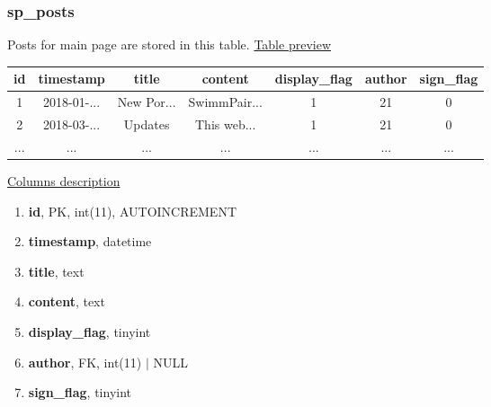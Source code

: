 \subsubsection*{sp\_posts}
Posts for main page are stored in this table.
\newline
\underline{Table preview}
\begin{center}
  \begin{tabular}{||c c c c c c c||} 
  \hline
  id & timestamp & title & content & display\_flag & author & sign\_flag  \\ [0.5ex] 
  \hline\hline
  1 & 2018-01-... & New Por... & SwimmPair... & 1 & 21 & 0 \\ 
  \hline
  2 & 2018-03-...  & Updates & This web... & 1 & 21 & 0 \\ 
 \hline
  ... & ... & ... & ... & ... & ...  & ... \\ [0.5ex] 
  \hline
  \end{tabular}
\end{center}
\underline{Columns description}
\begin{enumerate}
  \setlength\itemsep{0em}
  \item \textbf{id}, PK, int(11), AUTOINCREMENT
  \item \textbf{timestamp}, datetime
  \item \textbf{title}, text
  \item \textbf{content}, text
  \item \textbf{display\_flag}, tinyint
  \item \textbf{author}, FK, int(11) $|$ NULL
  \item \textbf{sign\_flag}, tinyint
\end{enumerate}

